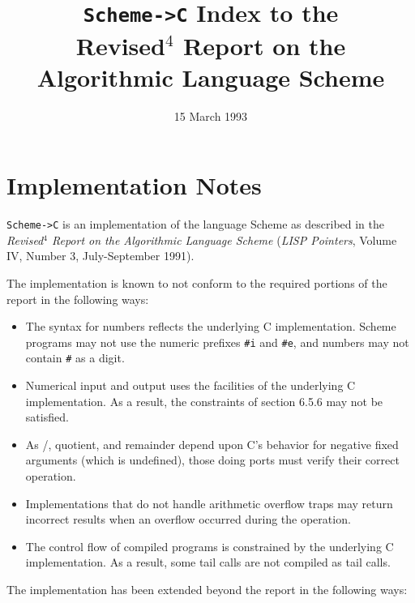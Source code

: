 \documentclass[10pt,twocolumn]{article}
\title{\texttt{Scheme->C} Index to the\\
Revised$^4$ Report on the Algorithmic Language Scheme}
\date{15 March 1993}
\begin{document}
\maketitle

\section*{Implementation Notes}

\texttt{Scheme->C} is an implementation of the language Scheme as
described in the \emph{Revised$^4$ Report on the Algorithmic Language
Scheme} (\emph{LISP Pointers}, Volume IV, Number 3, July-September 1991).

The implementation is known to not conform to the required portions of
the report in the following ways:

\begin{itemize}
\item
The syntax for numbers reflects the underlying C implementation.
Scheme programs may not use the numeric prefixes \texttt{\#i}
and \texttt{\#e}, and numbers may not contain \texttt{\#} as a digit.

\item
Numerical input and output uses the facilities of the
underlying C implementation.  As a result, the constraints of
section 6.5.6 may not be satisfied.

\item
As /, quotient, and remainder depend upon C's behavior for
negative fixed arguments (which is undefined), those doing ports
must verify their correct operation.

\item
Implementations that do not handle arithmetic overflow traps
may return incorrect results when an overflow occurred during
the operation.

\item
The control flow of compiled programs is constrained by the
underlying C implementation.  As a result, some tail calls are not compiled as
tail calls.
\end{itemize}

The implementation has been extended beyond the report in the
following ways:
\end{document}
